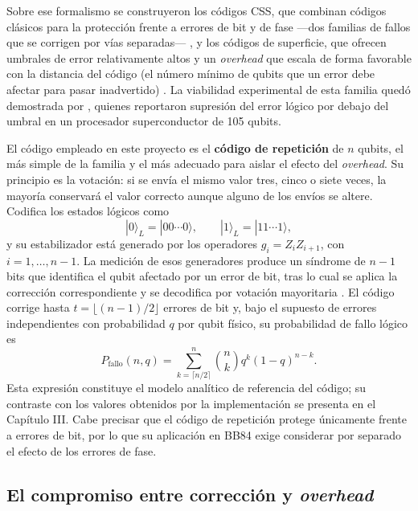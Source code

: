 \documentclass[12pt]{report}
\begin{document}
Sobre ese formalismo se construyeron los códigos CSS, que combinan códigos
clásicos para la protección frente a errores de bit y de fase —dos familias de
fallos que se corrigen por vías separadas— \citep{calderbank1996, steane1996}, y
los códigos de superficie, que ofrecen umbrales de error relativamente altos y un
\textit{overhead} que escala de forma favorable con la distancia del código (el
número mínimo de qubits que un error debe afectar para pasar inadvertido)
\citep{fowler2012, terhal2015}. La viabilidad experimental de esta familia quedó
demostrada por \citet{google2025}, quienes reportaron supresión del error lógico
por debajo del umbral en un procesador superconductor de 105 qubits.

El código empleado en este proyecto es el \textbf{código de repetición} de $n$
qubits, el más simple de la familia y el más adecuado para aislar el efecto del
\textit{overhead}. Su principio es la votación: si se envía el mismo valor tres,
cinco o siete veces, la mayoría conservará el valor correcto aunque alguno de los
envíos se altere. Codifica los estados lógicos como
\begin{equation}
|0\rangle_L = |00\cdots 0\rangle, \qquad |1\rangle_L = |11\cdots 1\rangle,
\label{eq:codigo}
\end{equation}
y su estabilizador está generado por los operadores $g_i = Z_iZ_{i+1}$, con
$i = 1, \ldots, n-1$. La medición de esos generadores produce un síndrome de
$n-1$ bits que identifica el qubit afectado por un error de bit, tras lo cual se
aplica la corrección correspondiente y se decodifica por votación mayoritaria
\citep{nielsen2010}. El código corrige hasta $t = \lfloor (n-1)/2 \rfloor$
errores de bit y, bajo el supuesto de errores independientes con probabilidad
$q$ por qubit físico, su probabilidad de fallo lógico es
\begin{equation}
P_{\text{fallo}}(n,q) = \sum_{k=\lceil n/2 \rceil}^{n} \binom{n}{k}
q^{k}(1-q)^{n-k}.
\label{eq:fallo}
\end{equation}
Esta expresión constituye el modelo analítico de referencia del código; su
contraste con los valores obtenidos por la implementación se presenta en el
Capítulo III. Cabe precisar que el código de repetición protege únicamente
frente a errores de bit, por lo que su aplicación en BB84 exige considerar por
separado el efecto de los errores de fase.

\subsection{El compromiso entre corrección y \textit{overhead}}
\label{sec:tradeoff}
\end{document}
